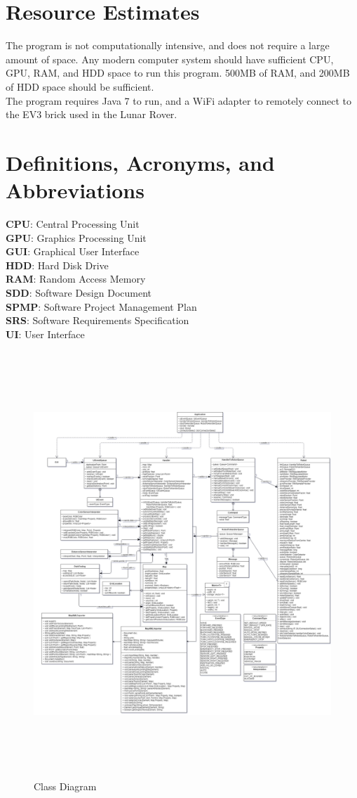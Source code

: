 \documentclass[12pt,a4paper]{article}
\begin{document}
\newpage
\section{Resource Estimates}
The program is not computationally intensive, and does not require a large amount of space. Any modern computer system should have sufficient CPU, GPU, RAM, and HDD space to run this program. 500MB of RAM, and 200MB of HDD space should be sufficient.\\
The program requires Java 7 to run, and a WiFi adapter to remotely connect to the EV3 brick used in the Lunar Rover.    

\section{Definitions, Acronyms, and Abbreviations}
\textbf{CPU}: Central Processing Unit\\
\textbf{GPU}: Graphics Processing Unit\\
\textbf{GUI}: Graphical User Interface\\
\textbf{HDD}: Hard Disk Drive\\
\textbf{RAM}: Random Access Memory\\
\textbf{SDD}: Software Design Document\\
\textbf{SPMP}: Software Project Management Plan\\
\textbf{SRS}: Software Requirements Specification\\
\textbf{UI}: User Interface\\

  
\begin{figure}
    	\centering
        \includegraphics[width = 24cm, height = 16cm]{Class_Diagram_2.png}
    	\caption{Class Diagram}
        \label{fig:class_diagram}
\end{figure}
\end{document}
